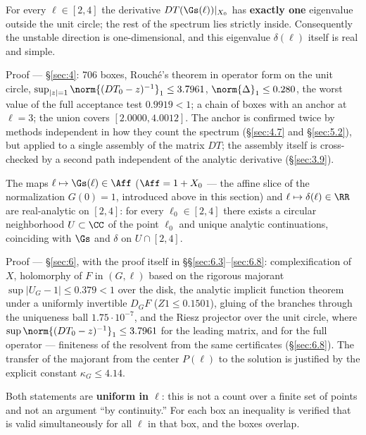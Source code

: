 \begin{namedtheorem}
For every $\ell \in [2, 4]$ the derivative $DT(\Gs(\ell))|_{X_{0}}$ has \textbf{exactly
one} eigenvalue outside the unit circle; the rest of the spectrum lies
strictly inside. Consequently the unstable direction is one-dimensional, and
this eigenvalue $\delta(\ell)$ itself is real and simple.
\end{namedtheorem}

Proof --- \S\ref{sec:4}: 706 boxes, Rouché's theorem in operator form on the
unit circle, $\sup_{|z|=1}\norm{(DT_{0}-z)^{-1}}_1 \le 3.7961$,
$\norm{\Delta}_1 \le 0.280$, the worst value of the full acceptance test $0.9919 < 1$;
a chain of boxes with an anchor at $\ell = 3$; the union covers
$[2.0000, 4.0012]$. The anchor is confirmed twice by methods independent in
how they count the spectrum (\S\ref{sec:4.7} and \S\ref{sec:5.2}), but applied to a single assembly
of the matrix $DT$; the assembly itself is cross-checked by a second path
independent of the analytic derivative (\S\ref{sec:3.9}).

\begin{namedtheorem}
The maps $\ell \mapsto \Gs(\ell) \in \Aff$ ($\Aff = 1 + X_{0}$ --- the affine slice of the normalization
$G(0)=1$, introduced above in this section) and $\ell \mapsto \delta(\ell) \in \RR$ are real-analytic
on $[2, 4]$: for every $\ell_0 \in [2,4]$ there exists a circular neighborhood
$U \subset \CC$ of the point $\ell_0$ and unique analytic continuations, coinciding
with $\Gs$ and $\delta$ on $U \cap [2, 4]$.
\end{namedtheorem}

Proof --- \S\ref{sec:6}, with the proof itself in
\S\S\ref{sec:6.3}--\ref{sec:6.8}: complexification of $X$, holomorphy of $F$ in $(G, \ell)$
based on the rigorous majorant $\sup |U_G - 1| \le 0.379 < 1$ over the disk,
the analytic implicit function theorem under a uniformly invertible
$D_G F$ ($Z1 \le 0.1501$), gluing of the branches through the uniqueness ball
$1.75\cdot 10^{-7}$, and the Riesz projector over the unit circle, where
$\sup \norm{(DT_{0}-z)^{-1}}_1 \le 3.7961$ for the leading matrix, and for the full operator ---
finiteness of the resolvent from the same certificates (\S\ref{sec:6.8}). The transfer of
the majorant from the center $P(\ell)$ to the solution is justified by the
explicit constant $\kappa_G \le 4.14$.

Both statements are \textbf{uniform in $\ell$}: this is not a count over a finite set of points
and not an argument ``by continuity.'' For each box an inequality is verified that is
valid simultaneously for all $\ell$ in that box, and the boxes overlap.


